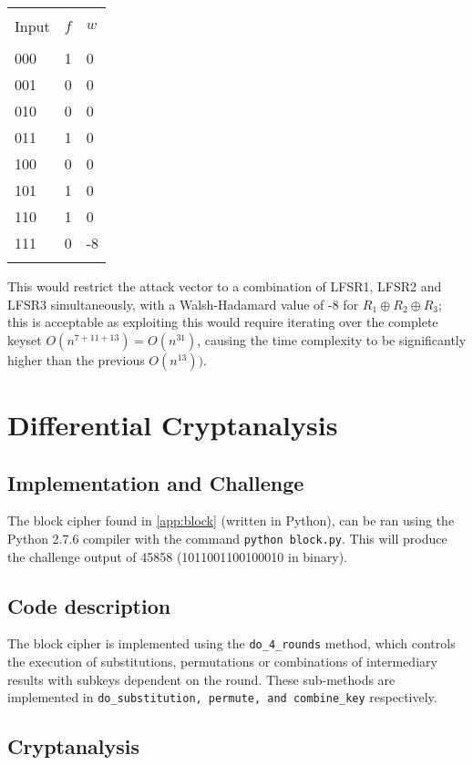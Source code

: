 \documentclass[british,11pt,a4paper]{article}
\begin{document}
\begin{center}
	\begin{tabular}{@{}lll@{}}\label{tab:walsh2} \\
		\toprule \\
		Input & \(f\) & \(w\) \\
		\midrule \\
		000   & 1     & 0     \\
		001   & 0     & 0     \\
		010   & 0     & 0     \\
		011   & 1     & 0     \\
		100   & 0     & 0     \\
		101   & 1     & 0     \\
		110   & 1     & 0     \\
		111   & 0     & -8    \\
		\bottomrule \\
	\end{tabular}
\end{center}
This would restrict the attack vector to a combination of LFSR1, LFSR2 and LFSR3 simultaneously, with a Walsh-Hadamard value of -8 for \(R_1 \oplus R_2 \oplus R_3\); this is acceptable as exploiting
this would require iterating over the complete keyset \(O(n^{7+11+13}) = O(n^{31})\), causing the time complexity to be significantly higher than the previous \(O(n^{13}))\).
\clearpage
\section{Differential Cryptanalysis}
\subsection{Implementation and Challenge}
The block cipher found in \autoref{app:block} (written in Python),
can be ran using the Python 2.7.6 compiler with the command \lstinline{python block.py}. This will produce the
challenge output of 45858 (1011001100100010 in binary).
\subsection{Code description}
The block cipher is implemented using the \lstinline{do_4_rounds} method, which controls the execution of substitutions, permutations or combinations
of intermediary results with subkeys dependent on the round. These sub-methods are implemented in \lstinline{do_substitution, permute, and combine_key} respectively.
\subsection{Cryptanalysis}
\end{document}
